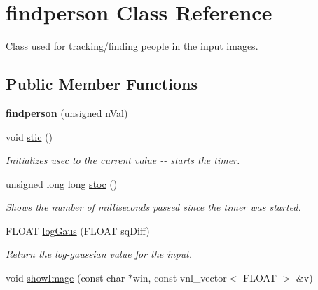 \hypertarget{classfindperson}{
\section{findperson Class Reference}
\label{classfindperson}
}


Class used for tracking/finding people in the input images.  


\subsection*{Public Member Functions}
\begin{DoxyCompactItemize}
\item 
\hypertarget{classfindperson_a4904516fd58fc28bf0acf8cc876e80eb}{
{\bfseries findperson} (unsigned nVal)}
\label{classfindperson_a4904516fd58fc28bf0acf8cc876e80eb}

\item 
\hypertarget{classfindperson_adad9d68d77b07e9fe42a0bafd02afa08}{
void \hyperlink{classfindperson_adad9d68d77b07e9fe42a0bafd02afa08}{stic} ()}
\label{classfindperson_adad9d68d77b07e9fe42a0bafd02afa08}

\begin{DoxyCompactList}\small\item\em Initializes {\ttfamily usec} to the current value -\/-\/ starts the timer. \item\end{DoxyCompactList}\item 
\hypertarget{classfindperson_ae8e079ae9b7283ccefaea08319f56ec0}{
unsigned long long \hyperlink{classfindperson_ae8e079ae9b7283ccefaea08319f56ec0}{stoc} ()}
\label{classfindperson_ae8e079ae9b7283ccefaea08319f56ec0}

\begin{DoxyCompactList}\small\item\em Shows the number of milliseconds passed since the timer was started. \item\end{DoxyCompactList}\item 
\hypertarget{classfindperson_aa2c5a86f3ed1ca84dbdc5099c896d5a6}{
FLOAT \hyperlink{classfindperson_aa2c5a86f3ed1ca84dbdc5099c896d5a6}{logGaus} (FLOAT sqDiff)}
\label{classfindperson_aa2c5a86f3ed1ca84dbdc5099c896d5a6}

\begin{DoxyCompactList}\small\item\em Return the log-\/gaussian value for the input. \item\end{DoxyCompactList}\item 
\hypertarget{classfindperson_a85a42b9ecddf18a17d67d9a484570c09}{
void \hyperlink{classfindperson_a85a42b9ecddf18a17d67d9a484570c09}{showImage} (const char $\ast$win, const vnl\_\-vector$<$ FLOAT $>$ \&v)}
\label{classfindperson_a85a42b9ecddf18a17d67d9a484570c09}


\end{DoxyCompactItemize}
